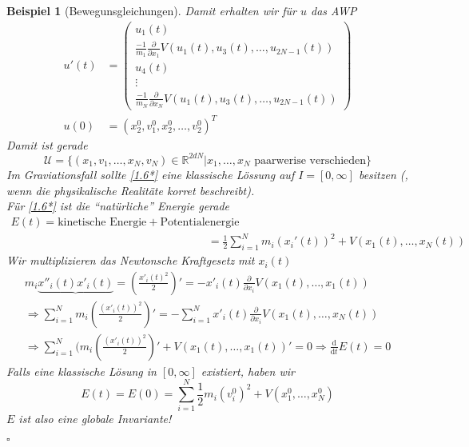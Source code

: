 \documentclass[11pt]{book}
\newcommand{\dd}{\mathrm{d}}
\newcommand{\RR}{\mathbb{R}}
\newcommand{\UU}{\mathcal{U}}
\newcommand{\myTag}[2][]{\tag{#2}\label{#1#2}}
\newcommand{\myQEDEnd}{\hfill\ensuremath{\square}}
\theoremstyle{break}
\theoremstyle{myStyle}
\newcounter{myCounter}[chapter]
\newtheorem{Bsp}[myCounter]{Beispiel}
\begin{document}
\begin{Bsp}[Bewegunsgleichungen]
  Damit erhalten wir f\"ur \( u \) das AWP \begin{align*}
    u'(t) &= \begin{pmatrix} u_1(t) \\
        \frac{-1}{m_1} \frac{\partial}{\partial x_1} V(u_1(t),u_3(t), \dotsc, u_{2N-1}(t)) \\
        u_4(t) \\ \vdots \\ 
        \frac{-1}{m_N}\frac{\partial}{\partial x_N} V(u_1(t),u_3(t), \dotsc, u_{2N-1}(t)) 
    \end{pmatrix} \myTag[1.6]{*} \\
    u(0) &= (x_2^0, v_1^0, x_2^0, \dotsc, v_2^0)^T
  \end{align*}
  Damit ist gerade \[ \UU = \{ (x_1,v_1,\dotsc,x_N,v_N)\in\RR^{2dN} |
    x_1,\dotsc,x_N \text{ paarwerise verschieden} \} \]
  Im Graviationsfall sollte \eqref{1.6*} eine klassische L\"ossung auf \(
  I=[0,\infty] \) besitzen (, wenn die physikalische Realit\"ate korret
  beschreibt). \\
  F\"ur \eqref{1.6*} ist die ``nat\"urliche'' Energie gerade \begin{align*} E(t) =
    \text{kinetische Energie} + \text{Potentialenergie} \\
    &= \frac{1}{2} \sum_{i=1}^N m_i (x_i'(t))^2 + V(x_1(t),\dotsc, x_N(t))
  \end{align*}
  Wir multiplizieren das Newtonsche Kraftgesetz mit \( x_i(t) \)
  \begin{align*}
    m_i\underbrace{x''_i(t) x'_i(t)}{= (\frac{x'_i(t)^2}{2})'} = - x'_i(t)
    \frac{\partial}{\partial x_i} V(x_1(t),\dotsc,x_1(t)) \\
    \Rightarrow \sum_{i=1}^N m_i (\frac{(x'_i(t))^2}{2})' = - \sum_{i=1}^N
    x'_i(t) \frac{\partial}{\partial x_i} V(x_1(t),\dotsc,x_N(t)) \\
    \Rightarrow \sum_{i=1}^N (m_i (\frac{(x'_i(t))^2}{2})' +
    V(x_1(t),\dotsc,x_1(t))' = 0
    \Rightarrow \frac{\dd}{\dd t} E(t) = 0
  \end{align*}
  Falls eine klassische L\"osung in \( [0, \infty] \) existiert, haben wir \[
    E(t) = E(0) = \sum_{i = 1}^N \frac{1}{2}m_i(v_i^0)^2 + V(x_1^0,\dotsc,x_N^0)
  \]
  \( E \) ist also eine globale Invariante!
  
  \myQEDEnd
\end{Bsp}
\end{document}
